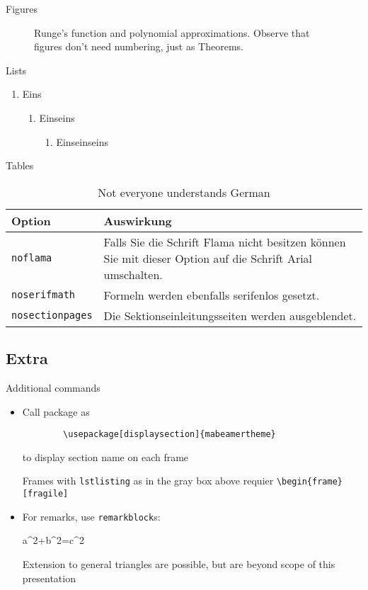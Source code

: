 \documentclass[12pt]{beamer}
\begin{document}
\begin{frame}{Figures}
\begin{figure}
\scalebox{0.6}{}
\caption{Runge's function and polynomial approximations. Observe that figures don't need numbering, just as Theorems.}
\end{figure}

\end{frame}
\begin{frame}{Lists}
\begin{enumerate}
\item Eins
\begin{enumerate}
\item Einseins
\begin{enumerate}
\item Einseinseins
\end{enumerate}
\end{enumerate}
\end{enumerate}
\end{frame}
\begin{frame}{Tables}
\begin{table}[]
\begin{tabularx}{\linewidth}{l>{\raggedright}X}
		\toprule
		\textbf{Option}			& \textbf{Auswirkung} \tabularnewline
		\midrule
		\texttt{noflama}		& Falls Sie die Schrift Flama nicht besitzen können Sie mit dieser Option auf die Schrift Arial umschalten. \tabularnewline
		\texttt{noserifmath}		& Formeln werden ebenfalls serifenlos gesetzt. \tabularnewline
		\texttt{nosectionpages} & Die Sektionseinleitungsseiten werden ausgeblendet.\tabularnewline
		\bottomrule
\end{tabularx}
\caption{Not everyone understands German}
\end{table}
\end{frame}
\subsection{Extra}
\begin{frame}[fragile]{Additional commands}
	\begin{itemize}
		\item Call package  as
		\begin{lstlisting}
		\usepackage[displaysection]{mabeamertheme}
		\end{lstlisting}
		to display section name on each frame
		\begin{alertblock}[\bigexclaim]
			Frames with \texttt{lstlisting} as in the gray box above requier 
			 \texttt{\textbackslash begin\{frame\}[fragile]}
		\end{alertblock}
		
		\item For remarks, 	use \texttt{remarkblock}s:
		\begin{equationblock}[Pythagoras]
			a^2+b^2=c^2
		\end{equationblock}
		\begin{remarkblock}
			\centering Extension to general triangles are possible, but are beyond scope of this presentation
		\end{remarkblock}
	\end{itemize}

\end{frame}
\end{document}

